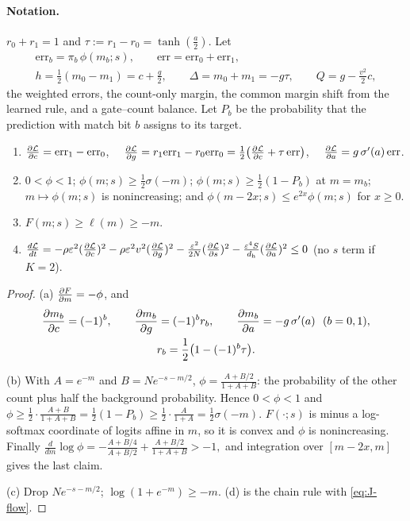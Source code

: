 \paragraph{Notation.} $r_0+r_1=1$ and $\tau:=r_1-r_0=\tanh(\frac{a}{2})$. Let
\begin{gather*}
 \mathrm{err}_b=\pi_b\,\phi(m_b;s),\qquad \mathrm{err}=\mathrm{err}_0+\mathrm{err}_1,\\
 h=\tfrac{1}{2}(m_0-m_1)=c+\tfrac{g}{2},\qquad \Delta=m_0+m_1=-g\tau,\qquad Q=g-\tfrac{v^2}{2}c,
\end{gather*}
the weighted errors, the count-only margin, the common margin shift from the learned rule, and a gate--count balance. Let $P_b$ be the
probability that the prediction with match bit $b$ assigns to its target.

\begin{lemma}[Derivatives]
\label{lem:J-geometry}
\begin{enumerate}[label=(\alph*),leftmargin=*,itemsep=2pt,topsep=3pt]
\item $\pd{\mathcal L}{c}=\mathrm{err}_1-\mathrm{err}_0$, $\quad\pd{\mathcal L}{g}=r_1\mathrm{err}_1-r_0\mathrm{err}_0=\tfrac{1}{2}\bigl(\pd{\mathcal L}{c}+\tau\,\mathrm{err}\bigr)$, $\quad\pd{\mathcal L}{a}=g\,\sigma'(a)\,\mathrm{err}$.
\item $0<\phi<1$; $\phi(m;s)\ge\frac{1}{2}\sigma(-m)$; $\phi(m;s)\ge\frac{1}{2}(1-P_b)$ at $m=m_b$; $m\mapsto\phi(m;s)$ is nonincreasing; and
$\phi(m-2x;s)\le e^{2x}\phi(m;s)$ for $x\ge0$.
\item $F(m;s)\ge\ell(m)\ge-m$.
\item $\ddt{\mathcal L}=-\rho\initscale^2(\pd{\mathcal L}{c})^2-\rho\initscale^2v^2(\pd{\mathcal L}{g})^2-\frac{\initscale^2}{2N}(\pd{\mathcal L}{s})^2-\frac{\initscale^4S}{d_{\mathrm h}}(\pd{\mathcal L}{a})^2\le0$ (no $s$ term if $K=2$).
\end{enumerate}
\end{lemma}

\begin{proof}
(a) $\pd{F}{m}=-\phi$, and
\begin{gather*}
 \pd{m_b}{c}=(-1)^b,\qquad \pd{m_b}{g}=(-1)^br_b,\qquad \pd{m_b}{a}=-g\,\sigma'(a)\ \ (b=0,1),\\
 r_b=\tfrac{1}{2}\bigl(1-(-1)^b\tau\bigr).
\end{gather*}

(b) With $A=e^{-m}$ and $B=Ne^{-s-m/2}$, $\phi=\frac{A+B/2}{1+A+B}$: the probability of the other count plus half the background
probability. Hence $0<\phi<1$ and
 $\phi\ge\frac{1}{2}\cdot\frac{A+B}{1+A+B}=\frac{1}{2}(1-P_b)\ge\frac{1}{2}\cdot\frac{A}{1+A}=\frac{1}{2}\sigma(-m).$ 
$F(\cdot;s)$ is minus a log-softmax coordinate of logits affine in $m$, so it is convex and $\phi$ is nonincreasing. Finally
 $\frac{d}{dm}\log\phi=-\frac{A+B/4}{A+B/2}+\frac{A+B/2}{1+A+B}>-1,$ 
and integration over $[m-2x,m]$ gives the last claim.

(c) Drop $Ne^{-s-m/2}$; $\log(1+e^{-m})\ge-m$. (d) is the chain rule with \cref{eq:J-flow}.
\end{proof}

